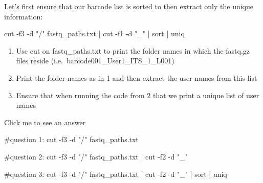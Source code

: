\documentclass[
  letterpaper,
  DIV=11,
  numbers=noendperiod]{scrreprt}
\newenvironment{Shaded}{}{}
\newcommand{\AttributeTok}[1]{\textcolor[rgb]{0.84,0.23,0.29}{#1}}
\newcommand{\CommentTok}[1]{\textcolor[rgb]{0.42,0.45,0.49}{#1}}
\newcommand{\FunctionTok}[1]{\textcolor[rgb]{0.44,0.26,0.76}{#1}}
\newcommand{\KeywordTok}[1]{\textcolor[rgb]{0.84,0.23,0.29}{#1}}
\newcommand{\NormalTok}[1]{\textcolor[rgb]{0.14,0.16,0.18}{#1}}
\newcommand{\StringTok}[1]{\textcolor[rgb]{0.01,0.18,0.38}{#1}}
\providecommand{\tightlist}{%
  \setlength{\itemsep}{0pt}\setlength{\parskip}{0pt}}\usepackage{longtable,booktabs,array}
\begin{document}
Let's first ensure that our barcode list is sorted to then extract only
the unique information:

\begin{Shaded}
\begin{Highlighting}[]
\FunctionTok{cut} \AttributeTok{{-}f3} \AttributeTok{{-}d} \StringTok{"/"}\NormalTok{ fastq\_paths.txt }\KeywordTok{|} \FunctionTok{cut} \AttributeTok{{-}f1} \AttributeTok{{-}d} \StringTok{"\_"} \KeywordTok{|} \FunctionTok{sort} \KeywordTok{|} \FunctionTok{uniq}
\end{Highlighting}
\end{Shaded}

\begin{tcolorbox}[enhanced jigsaw, breakable, left=2mm, title=\textcolor{quarto-callout-caution-color}{\faFire}\hspace{0.5em}{Exercise}, opacityback=0, opacitybacktitle=0.6, rightrule=.15mm, bottomrule=.15mm, colback=white, colframe=quarto-callout-caution-color-frame, coltitle=black, bottomtitle=1mm, arc=.35mm, toprule=.15mm, colbacktitle=quarto-callout-caution-color!10!white, toptitle=1mm, titlerule=0mm, leftrule=.75mm]

\begin{enumerate}
\def\labelenumi{\arabic{enumi}.}
\tightlist
\item
  Use cut on fastq\_paths.txt to print the folder names in which the
  fastq.gz files reside (i.e.~barcode001\_User1\_ITS\_1\_L001)
\item
  Print the folder names as in 1 and then extract the user names from
  this list
\item
  Ensure that when running the code from 2 that we print a unique list
  of user names
\end{enumerate}

Click me to see an answer

\begin{Shaded}
\begin{Highlighting}[]
\CommentTok{\#question 1:}
\FunctionTok{cut} \AttributeTok{{-}f3} \AttributeTok{{-}d} \StringTok{"/"}\NormalTok{ fastq\_paths.txt}

\CommentTok{\#question 2:}
\FunctionTok{cut} \AttributeTok{{-}f3} \AttributeTok{{-}d} \StringTok{"/"}\NormalTok{ fastq\_paths.txt }\KeywordTok{|} \FunctionTok{cut} \AttributeTok{{-}f2} \AttributeTok{{-}d} \StringTok{"\_"}

\CommentTok{\#question 3:}
\FunctionTok{cut} \AttributeTok{{-}f3} \AttributeTok{{-}d} \StringTok{"/"}\NormalTok{ fastq\_paths.txt }\KeywordTok{|} \FunctionTok{cut} \AttributeTok{{-}f2} \AttributeTok{{-}d} \StringTok{"\_"} \KeywordTok{|} \FunctionTok{sort} \KeywordTok{|} \FunctionTok{uniq}
\end{Highlighting}
\end{Shaded}

\end{tcolorbox}
\end{document}
